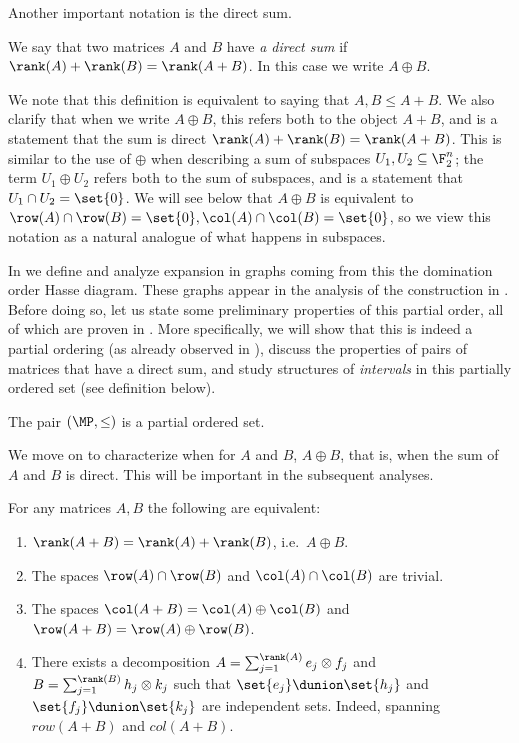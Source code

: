 Another important notation is the direct sum.
\begin{definition}
    We say that two matrices \(A\) and \(B\) have \emph{a direct sum} if \(\rank(A) + \rank(B) = \rank(A+B)\). In this case we write \(A \oplus B\).
\end{definition}
We note that this definition is equivalent to saying that \(A,B \leq A+B\).
We also clarify that when we write \(A \oplus B\), this refers both to the object \(A+B\), and is a statement that the sum is direct \(\rank(A) + \rank(B) = \rank(A+B)\). This is similar to the use of \(\oplus\) when describing a sum of subspaces \(U_1,U_2 \subseteq \F_2^n\); the term \(U_1 \oplus U_2\) refers both to the sum of subspaces, and is a statement that \(U_1 \cap U_2 = \set{0}\). We will see below that \(A \oplus B\) is equivalent to \(\row(A) \cap \row(B) = \set{0}, \col(A) \cap \col(B)= \set{0}\), so we view this notation as a natural analogue of what happens in subspaces.

In  we define and analyze expansion in graphs coming from this the domination order Hasse diagram. These graphs appear in the analysis of the construction in . Before doing so, let us state some preliminary properties of this partial order, all of which are proven in . More specifically, we will show that this is indeed a partial ordering (as already observed in \cite{Golowich2023}), discuss the properties of pairs of matrices that have a direct sum, and study structures of \emph{intervals} in this partially ordered set (see definition below). %

\begin{claim} \label{claim:domination-is-partial-order}
    The pair \((\MP,\leq)\) is a partial ordered set. %
\end{claim}

We move on to characterize when for \(A\) and \(B\), \(A \oplus B\), that is, when the sum of \(A\) and \(B\) is direct. This will be important in the subsequent analyses.
\begin{claim} \label{claim:trivially-intersecting spaces}
    For any matrices \(A,B\) the following are equivalent:
    \begin{enumerate}
        \item \(\rank(A+B) = \rank(A) + \rank(B)\), i.e.\ \(A \oplus B\).
        \item The spaces \(\row(A) \cap \row(B)\) and \(\col(A) \cap \col(B)\) are trivial.
        \item The spaces \(\col(A+B) = \col(A) \oplus \col(B)\) and \(\row(A+B) = \row(A) \oplus \row(B)\).
        \item There exists a decomposition \(A = \sum_{j=1}^{\rank(A)} e_j \otimes f_j\) and \(B = \sum_{j=1}^{\rank(B)}h_j \otimes k_j\) such that \(\set{e_j} \dunion \set{h_j}\) and \(\set{f_j} \dunion \set{k_j}\) are independent sets. Indeed, spanning \(row(A+B)\) and \(col(A+B)\).
    \end{enumerate}
\end{claim}

